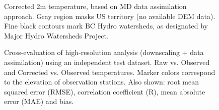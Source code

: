 \documentclass{article}
\begin{document}
\begin{landscape}
\begin{figure}
\caption{Corrected 2m temperature, based on MD data assimilation approach. Gray region masks US territory (no available DEM data). Fine black contours mark BC Hydro watersheds, as designated by Major Hydro Watersheds Project.}\label{fig:correctedT}
\end{figure}

\begin{figure}
\caption{Cross-evaluation of high-resolution analysis (downscaling + data assimilation) using an independent test dataset. Raw vs. Observed and Corrected vs. Observed temperatures. Marker colors correspond to the elevation of observation stations. Also shown: root mean squared error (RMSE), correlation coefficient (R), mean absolute error (MAE) and bias. }\label{fig:verifDA}
\end{figure}

\end{landscape}
\restoregeometry
\pagestyle{plain}
\FloatBarrier

\newpage


\end{document}
